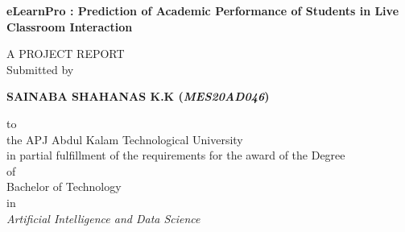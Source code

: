 \begin{titlepage}
\thispagestyle{empty}
         
		\begin{center}
        \textbf{\fontsize{14}{12}\selectfont eLearnPro : Prediction of Academic Performance of Students in Live Classroom Interaction}
		\end{center}

		\vspace*{0.5cm}

		\begin{center}
				\MakeUppercase{A Project Report}\\
		      	Submitted by\\
		 \vspace{0.5cm}
				
				 \textbf{\fontsize{14}{12}\selectfont SAINABA SHAHANAS K.K (\textit{MES20AD046})}\\
               
                 
		\end{center}

    \vspace{0.5cm}

		\begin{center}
		to\\
		the APJ Abdul Kalam Technological University\\
in partial fulfillment of the requirements for the award of the Degree\\
of\\
Bachelor of Technology\\
 in\\
 \textit{Artificial Intelligence and Data Science}\\
		
		\end{center}


\end{titlepage}
